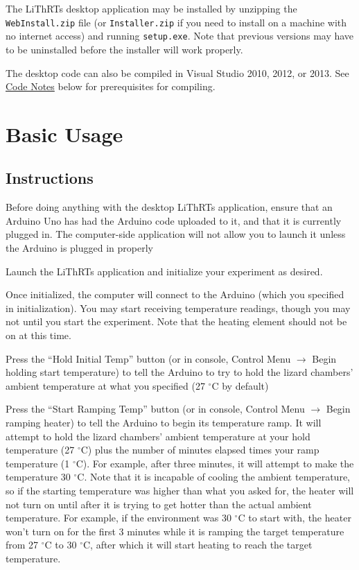 \documentclass[twoside,a4paper]{refart}
\newcommand{\Lizards}[0]{LiThRTs }
\newcommand{\degrees}{$^{\circ}$}
\begin{document}
The \Lizards desktop application may be installed by unzipping the \\ \verb|WebInstall.zip| file (or \verb|Installer.zip| if you need to install on a machine with no internet access) and running \verb|setup.exe|. Note that previous versions may have to be uninstalled before the installer will work properly.

The desktop code can also be compiled in Visual Studio 2010, 2012, or 2013. See \hyperref[codenotes]{Code Notes} below for prerequisites for compiling.

\section{Basic Usage}

\subsection{Instructions}

Before doing anything with the desktop \Lizards application, ensure that an Arduino Uno has had the Arduino code uploaded to it, and that it is currently plugged in. The computer-side application will not allow you to launch it unless the Arduino is plugged in properly

Launch the \Lizards application and initialize your experiment as desired.

Once initialized, the computer will connect to the Arduino (which you specified in initialization). You may start receiving temperature readings, though you may not until you start the experiment. Note that the heating element should not be on at this time.

Press the ``Hold Initial Temp'' button (or in console, Control Menu $\rightarrow$ Begin holding start temperature) to tell the Arduino to try to hold the lizard chambers' ambient temperature at what you specified (27 \degrees C by default)

Press the ``Start Ramping Temp'' button (or in console, Control Menu $\rightarrow$ Begin ramping heater) to tell the Arduino to begin its temperature ramp. It will attempt to hold the lizard chambers' ambient temperature at your hold temperature (27 \degrees C) plus the number of minutes elapsed times your ramp temperature (1 \degrees C). For example, after three minutes, it will attempt to make the temperature 30 \degrees C. Note that it is incapable of cooling the ambient temperature, so if the starting temperature was higher than what you asked for, the heater will not turn on until after it is trying to get hotter than the actual ambient temperature. For example, if the environment was 30 \degrees C to start with, the heater won't turn on for the first 3 minutes while it is ramping the target temperature from 27 \degrees C to 30 \degrees C, after which it will start heating to reach the target temperature.
\end{document}
